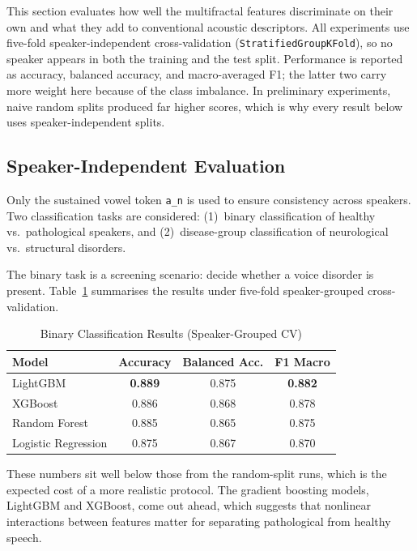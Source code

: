 \documentclass[runningheads]{llncs}
\begin{document}
  This section evaluates how well the multifractal features discriminate on their own and what they add to conventional acoustic descriptors. All experiments use five-fold speaker-independent cross-validation (\texttt{StratifiedGroupKFold}), so no speaker appears in both the training and the test split. Performance is reported as accuracy, balanced accuracy, and macro-averaged F1; the latter two carry more weight here because of the class imbalance. In preliminary experiments, naive random splits produced far higher scores, which is why every result below uses speaker-independent splits.

  \subsection{Speaker-Independent Evaluation}

  Only the sustained vowel token \texttt{a\_n} is used to ensure consistency across speakers. Two classification tasks are considered: (1)~binary classification of healthy vs.\ pathological speakers, and (2)~disease-group classification of neurological vs.\ structural disorders.

  The binary task is a screening scenario: decide whether a voice disorder is present. Table~\ref{tab:binary_results} summarises the results under five-fold speaker-grouped cross-validation.

  \begin{table}[htbp]
  \centering
  \caption{Binary Classification Results (Speaker-Grouped CV)}
  \label{tab:binary_results}
  \begin{tabular}{lccc}
  \toprule
  \textbf{Model} & \textbf{Accuracy} & \textbf{Balanced Acc.} & \textbf{F1 Macro} \\
  \midrule
  LightGBM & \textbf{0.889} & 0.875 & \textbf{0.882} \\
  XGBoost & 0.886 & 0.868 & 0.878 \\
  Random Forest & 0.885 & 0.865 & 0.875 \\
  Logistic Regression & 0.875 & 0.867 & 0.870 \\
  \bottomrule
  \end{tabular}
  \end{table}

  These numbers sit well below those from the random-split runs, which is the expected cost of a more realistic protocol. The gradient boosting models, LightGBM and XGBoost, come out ahead, which suggests that nonlinear interactions between features matter for separating pathological from healthy speech.
\end{document}
